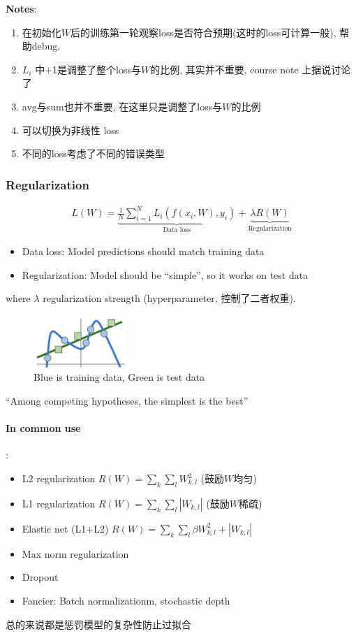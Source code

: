 \textbf{Notes}:
\begin{enumerate}\small
    \item 在初始化$W$后的训练第一轮观察loss是否符合预期(这时的loss可计算一般), 帮助debug. 
    \item $L_i$ 中+1是调整了整个loss与$W$的比例, 其实并不重要, course note 上据说讨论了
    \item avg与sum也并不重要, 在这里只是调整了loss与$W$的比例
    \item 可以切换为非线性 loss
    \item 不同的loss考虑了不同的错误类型
\end{enumerate}

\subsubsection{Regularization}
\begin{align*}
    L(W)=\underbrace{\frac{1}{N}\sum_{i=1}^N L_i (f(x_i, W), y_i)}_{\text{Data loss}}+\underbrace{\lambda R(W)}_{\text{Regularization}}
\end{align*}
\begin{itemize}\small
    \item Data loss: Model predictions should match training data
    \item Regularization: Model should be ``simple'', so it works on test data
\end{itemize}

where $\lambda$  regularization strength (hyperparameter, 控制了二者权重). 

\begin{figure}[!htb]
    \centering
    \includegraphics[width=0.309\textwidth]{pic/Lec3/Regularization.png}
    \caption{Blue is training data, Green is test data}
\end{figure}

``Among competing hypotheses, the simplest is the best''

\paragraph{In common use}:
\begin{itemize}\small
    \item L2 regularization $R(W)=\sum_k\sum_l W^2_{k,l}$ (鼓励$W$均匀)
    \item L1 regularization $R(W)=\sum_k\sum_l |W_{k,l}|$ (鼓励$W$稀疏)
    \item Elastic net (L1+L2) $R(W)=\sum_k\sum_l \beta W^2_{k,l}+|W_{k,l}|$
    \item Max norm regularization
    \item Dropout
    \item Fancier: Batch normalizationm, stochastic depth
\end{itemize}
总的来说都是惩罚模型的复杂性防止过拟合

